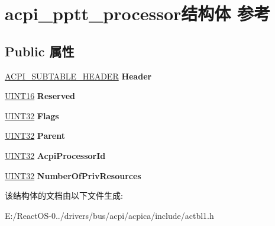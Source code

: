 \hypertarget{structacpi__pptt__processor}{}\section{acpi\+\_\+pptt\+\_\+processor结构体 参考}
\label{structacpi__pptt__processor}
\subsection*{Public 属性}
\begin{DoxyCompactItemize}
\item 
\mbox{\label{structacpi__pptt__processor_ab88b006474b41f42d2fc75c5caf4c6f6}} 
\hyperlink{structacpi__subtable__header}{A\+C\+P\+I\+\_\+\+S\+U\+B\+T\+A\+B\+L\+E\+\_\+\+H\+E\+A\+D\+ER} {\bfseries Header}
\item 
\mbox{\label{structacpi__pptt__processor_a05e3f63f4522eb6ef93ea8ae6687898f}} 
\hyperlink{_processor_bind_8h_a09f1a1fb2293e33483cc8d44aefb1eb1}{U\+I\+N\+T16} {\bfseries Reserved}
\item 
\mbox{\label{structacpi__pptt__processor_a229456395692f641b63b07808bef3aa1}} 
\hyperlink{_processor_bind_8h_ae1e6edbbc26d6fbc71a90190d0266018}{U\+I\+N\+T32} {\bfseries Flags}
\item 
\mbox{\label{structacpi__pptt__processor_a67c47ca48c385c11923d32a358c8a2ce}} 
\hyperlink{_processor_bind_8h_ae1e6edbbc26d6fbc71a90190d0266018}{U\+I\+N\+T32} {\bfseries Parent}
\item 
\mbox{\label{structacpi__pptt__processor_a2ee39952e7676354eb399cd9530a5ae7}} 
\hyperlink{_processor_bind_8h_ae1e6edbbc26d6fbc71a90190d0266018}{U\+I\+N\+T32} {\bfseries Acpi\+Processor\+Id}
\item 
\mbox{\label{structacpi__pptt__processor_ae54d3b0cc9f867119760eb0b1f650a9e}} 
\hyperlink{_processor_bind_8h_ae1e6edbbc26d6fbc71a90190d0266018}{U\+I\+N\+T32} {\bfseries Number\+Of\+Priv\+Resources}
\end{DoxyCompactItemize}


该结构体的文档由以下文件生成\+:\begin{DoxyCompactItemize}
\item 
E\+:/\+React\+O\+S-\/0../drivers/bus/acpi/acpica/include/actbl1.\+h\end{DoxyCompactItemize}
